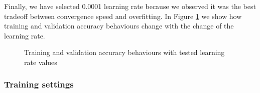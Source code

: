 			\smallskip
			
			Finally, we have selected 0.0001 learning rate because we observed it was the best tradeoff between convergence speed and overfitting.
			In Figure \ref{fig:val_acc_lr} we show how training and validation accuracy behaviours change with the change of the learning rate.
			
			\begin{figure}[H] 
				\hspace*{\fill}
				\hspace*{\fill}
				\caption{Training and validation accuracy behaviours with tested learning rate values}
				\label{fig:val_acc_lr}
			\end{figure}
			
		\subsubsection{Training settings} \label{training_settings}
		
